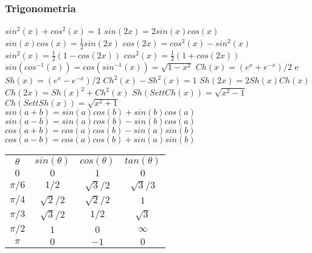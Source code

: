 \documentclass[fontsize=8pt]{scrartcl}
\begin{document}
\pagestyle{empty}
\fontsize{6pt}{8pt}\selectfont

\begin{multicols*}{4}


\subsubsection*{Trigonometria}
$sin^2(x) + cos^2(x) = 1$\newline
$sin(2x) = 2 sin(x) cos(x)$\newline
$sin(x)cos(x) = \frac{1}{2}sin(2x)$\newline
$cos(2x) = cos^2(x) - sin^2(x)$\newline
$sin^2(x) = \frac{1}{2}(1-cos(2x))$\newline
$cos^2(x) = \frac{1}{2} (1+cos(2x))$\newline
$sin(cos^{-1}(x)) = cos(sin^{-1}(x)) = \sqrt{1-x^2}$\newline
$Ch(x) = (e^x + e^{-x})/2$ e $Sh(x) = (e^{x}-e^{-x})/2$\newline
$Ch^2(x) - Sh^2(x) = 1$\newline
$Sh(2x) = 2 Sh(x) Ch(x)$\newline
$Ch(2x) = Sh(x)^2 + Ch^2(x)$\newline
$Sh(SettCh(x)) = \sqrt{x^2 -1}$\newline
$Ch(SettSh(x)) = \sqrt{x^2 +1}$\newline
$sin(a+b) = sin(a)cos(b) + sin(b)cos(a)$\newline
$sin(a-b) = sin(a) cos(b) - sin(b) cos(a)$\newline
$cos(a+b) = cos(a)cos(b) - sin(a) sin(b)$\newline
$cos(a-b) = cos(a)cos(b) + sin(a) sin(b)$
\begin{tabular}{ | c c c c | }
    \hline
    $\theta$ & $sin(\theta)$ & $cos(\theta)$ & $tan(\theta)$ \\
    $0$     & $0$          & $1$ & $0$ \\
    $\pi/6$ & $1/2$        & $\sqrt{3}/2$ & $\sqrt{3}/3$ \\
    $\pi/4$ & $\sqrt{2}/2$ & $\sqrt{2}/2$ & $1$ \\
    $\pi/3$ & $\sqrt{3}/2$ & $1/2$ & $\sqrt{3}$ \\
    $\pi/2$ & $1$          & $0$ & $\infty$ \\
    $\pi$   & $0$          & $-1$ & $0$ \\
    \hline
\end{tabular}

\end{multicols*}
\end{document}
